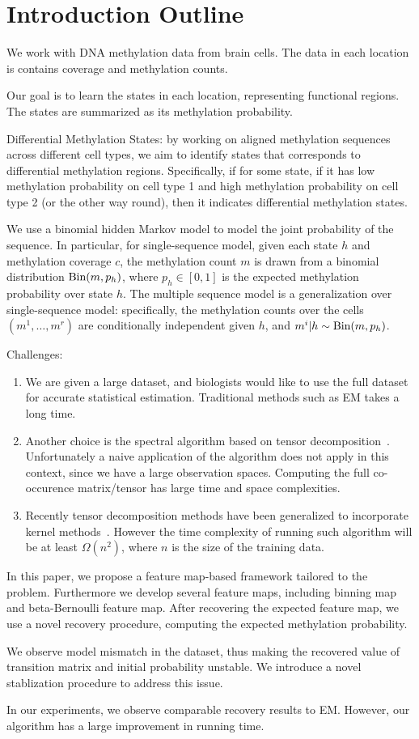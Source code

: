 \section{Introduction Outline}

We work with DNA methylation data from brain cells.  The data in each location is contains coverage and methylation counts.

Our goal is to learn the states in each location, representing functional regions. The states are summarized as its methylation probability.

Differential Methylation States: by working on aligned methylation sequences across different cell types, we aim to identify
states that corresponds to differential methylation regions. Specifically, if for some state, if it has low methylation probability on
cell type 1 and high methylation probability on cell type 2 (or the other way round), then it indicates differential methylation states.

We use a binomial hidden Markov model to model the joint probability of the sequence. In particular, for single-sequence model,
given each state $h$ and methylation
coverage $c$, the methylation count $m$ is drawn from a binomial distribution $\text{Bin}(m,p_h)$, where $p_h \in [0,1]$ is the expected methylation
probability over state $h$. The multiple sequence model is a generalization over single-sequence model: specifically, the methylation counts over the cells
$(m^1, \ldots, m^r)$ are conditionally independent given $h$, and $m^i | h \sim \text{Bin}(m,p_h)$.

Challenges:
\begin{enumerate}
\item We are given a large dataset, and biologists would like to use the full dataset for accurate statistical estimation. Traditional methods such as EM takes
a long time.
\item Another choice is the spectral algorithm based on tensor decomposition~\cite{AGHKT12}. Unfortunately a naive application
of the algorithm does not apply in this context, since we have a large observation spaces.
Computing the full co-occurence matrix/tensor has large time and space complexities.
\item Recently tensor decomposition methods have been generalized to incorporate kernel methods~\cite{SADX14}. However the time complexity of running such algorithm will be at least
$\Omega(n^2)$, where $n$ is the size of the training data.
\end{enumerate}

In this paper, we propose a feature map-based framework tailored to the problem. Furthermore we develop several feature maps, including binning map and beta-Bernoulli
feature map. After recovering the expected feature map, we use a novel recovery procedure, computing the expected methylation probability.

We observe model mismatch in the dataset, thus making the recovered value of transition matrix and initial probability unstable. We introduce a novel stablization
 procedure to address this issue.

In our experiments, we observe comparable recovery results to EM. However, our algorithm has a large improvement in running time.
